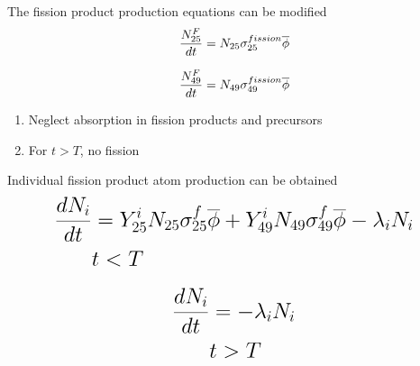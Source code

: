 \documentclass[aspectratio=1610,pdftex,dvipsnames,compress,xcolor={dvipsnames}]{beamer}
\begin{document}
\begin{frame}{The fission product production equations can be modified}
    \begin{equation}
        \LARGE
        \frac{N_{25}^F}{dt}=N_{25} \sigma_{25}^{fission} \overline{\phi}
    \end{equation}
    
    \begin{equation}
        \LARGE
        \frac{N_{49}^F}{dt}=N_{49} \sigma_{49}^{fission} \overline{\phi}
    \end{equation}
    
    \vspace*{\fill}

    \begin{enumerate}[series=outerlist,topsep=0pt,itemsep=21pt,leftmargin=*,label=(\arabic*)]
        \item[]Neglect absorption in fission products and precursors
        \item[]For $t > T$, no fission
    \end{enumerate}
\end{frame}


\begin{frame}{Individual fission product atom production can be obtained}
    \begin{equation}
        \LARGE
        \begin{aligned}
            \frac{dN_i}{dt} & = Y_{25}^i N_{25}\sigma_{25}^f\overline{\phi} + Y_{49}^i N_{49}\sigma_{49}^f\overline{\phi}-\lambda_iN_i
            \\
            & t < T
        \end{aligned}
    \end{equation}
    
    \begin{equation}
        \LARGE
        \begin{aligned}
            \frac{dN_i}{dt} & = -\lambda_iN_i
            \\
            & t > T
        \end{aligned}
    \end{equation}
\end{frame}
\end{document}

